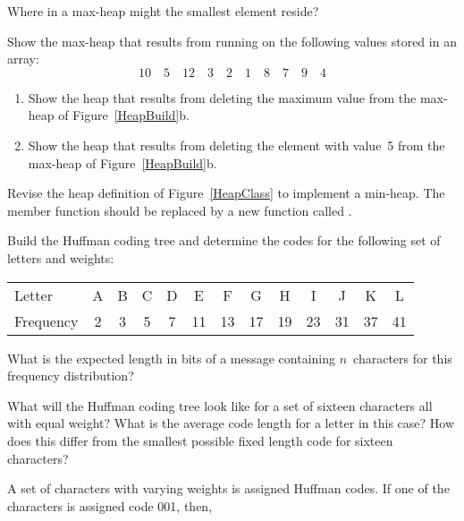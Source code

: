\begin{exercises}
\item
Where in a max-heap might the smallest element reside?

\item
Show the max-heap that results from running  on the
following values stored in an array:
\[ 10\quad 5\quad 12\quad 3\quad 2\quad 1\quad 8\quad 7\quad 9\quad 4 \]

\item
\begin{enumerate}
\item
Show the heap that results from deleting the maximum value from the
max-heap of Figure~\ref{HeapBuild}b.

\item
Show the heap that results from deleting the element with value~5 from
the max-heap of Figure~\ref{HeapBuild}b.
\end{enumerate}

\item
Revise the heap definition of Figure~\ref{HeapClass}
to implement a min-heap.
The member function  should be replaced by a new
function called .

\item
{}
Build the Huffman coding tree and determine the codes for the
following set of letters and
weights:

\smallskip
\begin{center}
\begin{tabular}{|l|cccccccccccc|}
\hline
\rule{0pt}{11pt}Letter      &A & B & C & D & E & F & G & H & I & J & K & L\\
\rule{0pt}{11pt}Frequency   &2 & 3 & 5 & 7 & 11 & 13 & 17 & 19 & 23 & 31 & 37 & 41\\
\hline
\end{tabular}
\end{center}

\smallskip
\noindent What is the expected length in bits of a message
containing \(n\)~characters for this frequency distribution?

\item
What will the Huffman coding tree look like for a set of sixteen
characters all with equal weight?
What is the average code length for a letter in this case?
How does this differ from the smallest possible fixed length code for
sixteen characters?

\item
A set of characters with varying weights is assigned
Huffman codes.
If one of the characters is assigned code 001, then,


\end{exercises}
